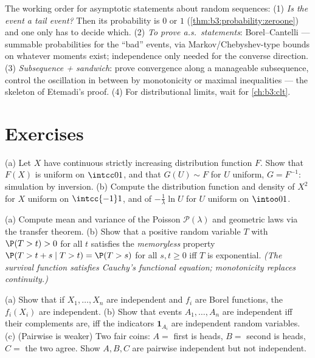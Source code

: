 \begin{method}\label{met:b3:probability:toolkit}
The working order for asymptotic statements about random
sequences: (1) \emph{Is the event a tail event?} Then its
probability is $0$ or $1$
(\cref{thm:b3:probability:zeroone}) and one only has to
decide which. (2) \emph{To prove a.s.\ statements}:
Borel--Cantelli --- summable probabilities for the
``bad'' events, via Markov/Chebyshev-type bounds on
whatever moments exist; independence only needed for the
converse direction. (3) \emph{Subsequence + sandwich}: prove
convergence along a manageable subsequence, control the
oscillation in between by monotonicity or maximal
inequalities --- the skeleton of Etemadi's proof. (4) For
distributional limits, wait for \cref{ch:b3:clt}.
\end{method}

\section{Exercises}

\begin{exercise}[$\star$]\label{exo:b3:probability:1}
(a) Let $X$ have continuous strictly increasing distribution
function $F$. Show that $F(X)$ is uniform on $\intcc01$, and
that $G(U) \sim F$ for $U$ uniform, $G = F^{-1}$: simulation
by inversion.
(b) Compute the distribution function and density of $X^2$
for $X$ uniform on $\intcc{-1}1$, and of $-\frac1\lambda\ln
U$ for $U$ uniform on $\intoo01$.
\end{exercise}

\begin{exercise}[$\star$]\label{exo:b3:probability:2}
(a) Compute mean and variance of the Poisson $\mathcal
P(\lambda)$ and geometric laws via the transfer theorem.
(b) Show that a positive random variable $T$ with $\P(T > t)
> 0$ for all $t$ satisfies the \emph{memoryless} property $\P(T > t + s \mid
T > t) = \P(T > s)$ for all $s, t \geq 0$ iff $T$ is
exponential. \emph{(The survival function satisfies Cauchy's
functional equation; monotonicity replaces continuity.)}
\end{exercise}

\begin{exercise}[$\star\star$]\label{exo:b3:probability:3}
(a) Show that if $X_1, \dots, X_n$ are independent and $f_i$
are Borel functions, the $f_i(X_i)$ are independent.
(b) Show that events $A_1, \dots, A_n$ are independent iff
their complements are, iff the indicators $\mathbf 1_{A_i}$
are independent random variables.
(c) (Pairwise is weaker) Two fair coins: $A = $ first is
heads, $B = $ second is heads, $C = $ the two agree. Show
$A, B, C$ are pairwise independent but not independent.
\end{exercise}

